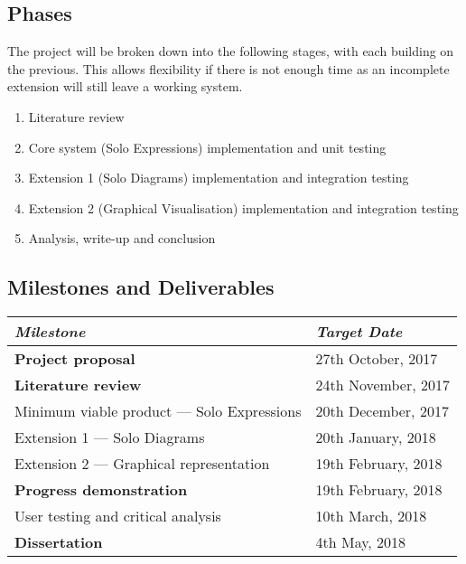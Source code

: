 \documentclass{article}
\begin{document}
\subsection{Phases}
The project will be broken down into the following stages, with each building on the previous. This allows flexibility if there is not enough time as an incomplete extension will still leave a working system.
\begin{enumerate}
	\item Literature review
	\item Core system (Solo Expressions) implementation and unit testing
	\item Extension 1 (Solo Diagrams) implementation and integration testing
	\item Extension 2 (Graphical Visualisation) implementation and integration testing
	\item Analysis, write-up and conclusion
\end{enumerate}

\subsection{Milestones and Deliverables}
\begin{center}
	\begin{tabular}{ l l }
		\toprule
		\textit{Milestone} & \textit{Target Date} \\
		\midrule
		\textbf{Project proposal} & {27th October, 2017} \\
		\textbf{Literature review} & {24th November, 2017} \\
		{Minimum viable product --- Solo Expressions} & {20th December, 2017} \\
		{Extension 1 --- Solo Diagrams} & {20th January, 2018} \\
		{Extension 2 --- Graphical representation} & {19th February, 2018} \\
		\textbf{Progress demonstration} & {19th February, 2018} \\
		{User testing and critical analysis} & {10th March, 2018} \\
		\textbf{Dissertation} & {4th May, 2018} \\
		\bottomrule
	\end{tabular}
\end{center}
\end{document}
